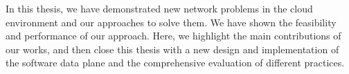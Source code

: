 
In this thesis, we have demonstrated new network problems in the cloud environment
and our approaches to solve them. We have shown the feasibility and performance
of our approach. 
Here, we highlight the main contributions of our works, and then close this thesis with
a new design and implementation of the software data plane and the comprehensive evaluation of different practices.

